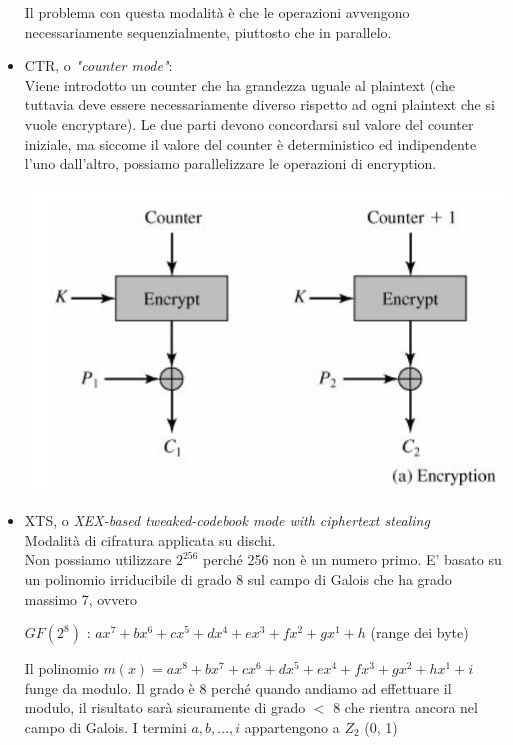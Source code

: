 \documentclass[11pt, oneside]{article}   	%
\begin{document}
\begin{itemize}
\begin{center}
\end{center}
Il problema con questa modalità è che le operazioni avvengono necessariamente sequenzialmente, piuttosto che in parallelo. 
\item CTR, o \emph{"counter mode"}:\\
Viene introdotto un counter che ha grandezza uguale al plaintext (che tuttavia deve essere necessariamente diverso rispetto ad ogni plaintext che si vuole encryptare). Le due parti devono concordarsi sul valore del counter iniziale, ma siccome il valore del counter è deterministico ed indipendente l'uno dall'altro, possiamo parallelizzare le operazioni di encryption.
\begin{center}
\includegraphics[scale= 0.7]{ctr}\\
\end{center}
\item XTS, o \emph{XEX-based tweaked-codebook mode with ciphertext stealing}\\
Modalità di cifratura applicata su dischi. \\Non possiamo utilizzare $2^{256}$ perché 256 non è un numero primo. E' basato su un polinomio irriducibile di grado 8 sul campo di Galois che ha grado massimo 7, ovvero\begin{center}
 $GF(2^8)$ : $ax^7+bx^6+cx^5+dx^4+ex^3+fx^2+gx^1+ h$ (range dei byte)
 \end{center}
Il polinomio $m(x) = ax^8+bx^7+cx^6+dx^5+ex^4+fx^3+gx^2+ hx^1 + i$ funge da modulo. Il grado è 8 perché quando andiamo ad effettuare il modulo, il risultato sarà sicuramente di grado $<$ $8$ che rientra ancora nel campo di Galois. I termini $a,b,...,i$ appartengono a $Z_2$ (0, 1)\\\\

\end{itemize}
\end{document}

